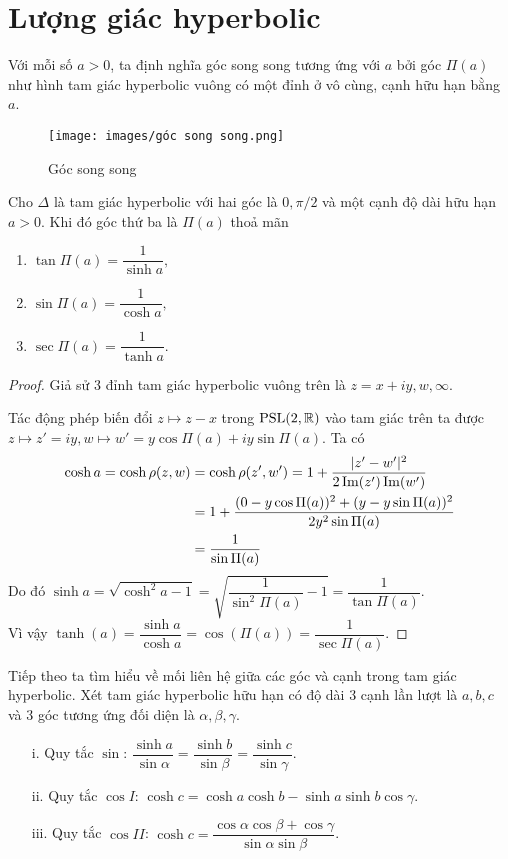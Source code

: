 \section{Lượng giác hyperbolic}
Với mỗi số $a > 0$, ta định nghĩa góc song song tương ứng với $a$ bởi góc $\Pi(a)$ như hình tam giác hyperbolic vuông có một đỉnh ở vô cùng, cạnh hữu hạn bằng $a$.
\begin{figure}[htp!]
    \centering
    \texttt{[image: images/góc song song.png]}
    \caption{Góc song song}
    \label{fig:enter-label}
\end{figure}
\begin{thm}\label{thm 2.5.1}
    Cho $\Delta$ là tam giác hyperbolic với hai góc là $0, \pi/2$ và một cạnh độ dài hữu hạn $a > 0$. Khi đó góc thứ ba là $\Pi(a)$ thoả mãn
    \begin{enumerate}
        \item $\tan{\Pi(a)} = \dfrac{1}{\sinh{a}},$
        \item $\sin{\Pi(a)} = \dfrac{1}{\cosh{a}},$
        \item $\sec{\Pi(a)} = \dfrac{1}{\tanh{a}}.$
    \end{enumerate}
\end{thm}
\begin{proof}
    Giả sử 3 đỉnh tam giác hyperbolic vuông trên là $z = x+iy, w, \infty$.
    
    Tác động phép biến đổi $z \mapsto z - x$ trong $\operatorname{PSL}(2,\mathbb{R})$ vào tam giác trên ta được $z \mapsto z'= iy, w \mapsto  w' = y\cos{\Pi(a)} + i y\sin{\Pi(a)}$. 
    Ta có 
    \begin{align*}
        \cosh{a} = \cosh{\rho(z,w)} &= \cosh{\rho(z',w')} = 1 + \dfrac{|z'-w'|^2}{2\operatorname{Im}(z')\operatorname{Im}(w')}\\
        &= 1 + \dfrac{(0-y\cos{\Pi(a)})^2+ (y-y\sin{\Pi(a)})^2}{2y^2\sin{\Pi(a)}}\\
        &= \dfrac{1}{\sin{\Pi(a)}}\\
    \end{align*}
    Do đó 
    $\sinh a = \sqrt{\cosh^2{a}-1} = \sqrt{\dfrac{1}{\sin^2{\Pi(a)}}-1} = \dfrac{1}{\tan{\Pi(a)}}$. \\
    Vì vậy $\tanh(a) = \dfrac{\sinh{a}}{\cosh{a}} = \cos(\Pi(a)) = \dfrac{1}{\sec{\Pi(a)}}$.
\end{proof}
Tiếp theo ta tìm hiểu về mối liên hệ giữa các góc và cạnh trong tam giác hyperbolic. Xét tam giác hyperbolic hữu hạn có độ dài 3 cạnh lần lượt là $a,b,c$ và 3 góc tương ứng đối diện là $\alpha, \beta, \gamma$. 
\begin{thm}\label{thm 2.5.2}
    \begin{itemize}
        \item [i.]Quy tắc $\sin$: $\dfrac{\sinh a}{\sin \alpha} = \dfrac{\sinh b}{\sin \beta} = \dfrac{\sinh c}{\sin \gamma}$.
        \item [ii.] Quy tắc $\cos I$: $\cosh c = \cosh a \cosh b - \sinh a \sinh b \cos{\gamma}$.
        \item[iii.] Quy tắc $\cos II$: $\cosh{c} =\dfrac{\cos \alpha \cos \beta + \cos \gamma }{\sin \alpha \sin \beta}$.
    \end{itemize}
\end{thm}
